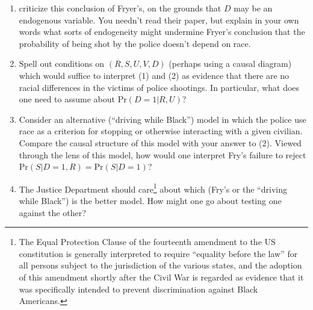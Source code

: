 \documentclass[12pt]{amsart}
\begin{document}
\begin{enumerate}
\item \cite{durlauf-heckman20} criticize this conclusion of Fryer's, on
the grounds that \(D\) may be an endogenous variable.  You needn't
read their paper, but explain in your own words what sorts of
endogeneity might undermine Fryer's conclusion that the
probability of being shot by the police doesn't depend on race.

\item Spell out conditions on \((R,S,U,V,D)\) (perhaps using a causal diagram)
which would suffice to interpret (1) and (2) as evidence
that there are no racial differences in the victims of police
shootings.  In particular, what does one need to assume about
\(\mbox{Pr}(D=1|R,U)\)?

\item Consider an alternative (``driving while Black'') model in which
the police use race as a criterion for stopping or otherwise
interacting with a given civilian.  Compare the causal structure
of this model with your answer to (2).  Viewed through the lens
of this model, how would one interpret Fry's failure to reject
\(\mbox{Pr}(S|D=1,R) = \mbox{Pr}(S|D=1)\)?

\item The Justice Department should care\footnote{The Equal Protection
Clause of the fourteenth amendment to the US constitution is
generally interpreted to require ``equality before the law'' for
all persons subject to the jurisdiction of the various states,
and the adoption of this amendment shortly after the Civil War
is regarded as evidence that it was specifically intended to
prevent discrimination against Black Americans.} about which
(Fry's or the ``driving while Black'') is the better model.  How
might one go about testing one against the other?
\end{enumerate}
\end{document}
